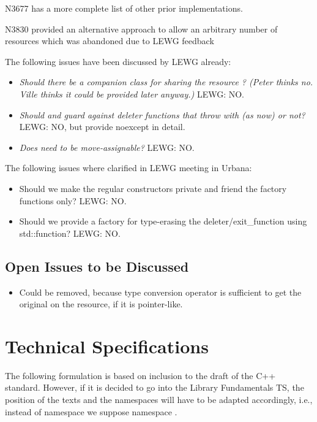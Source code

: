 \documentclass[ebook,11pt,article]{memoir}
\begin{document}
N3677 has a more complete list of other prior implementations.

N3830 provided an alternative approach to allow an arbitrary number of resources which was abandoned due to LEWG feedback 

The following issues have been discussed by LEWG already:
\begin{itemize}
\item \textit{Should there be a companion class for sharing the resource  ?  (Peter thinks no. Ville thinks it could be provided later anyway.) } LEWG: NO.
\item \textit{Should  and  guard against deleter functions that throw with  (as now) or not?} LEWG: NO, but provide noexcept in detail.
\item \textit{Does  need to be move-assignable? } LEWG: NO.
\end{itemize}
The following issues where clarified in LEWG meeting in Urbana:
\begin{itemize}
\item Should we make the regular constructors private and friend the factory functions only? LEWG: NO.
\item Should we provide a factory for type-erasing the deleter/exit_function using std::function? LEWG: NO.
\end{itemize}


\section{Open Issues to be Discussed}
\begin{itemize}
\item Could be removed, because type conversion operator is sufficient to get the original  on the resource, if it is pointer-like.
\end{itemize}


\chapter{Technical Specifications}
The following formulation is based on inclusion to the draft of the C++ standard. However, if it is decided to go into the Library Fundamentals TS, the position of the texts and the namespaces will have to be adapted accordingly, i.e., instead of namespace  we suppose namespace .
\end{document}
